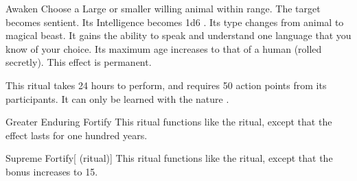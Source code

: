 \lowercase{\hypertarget{spell:Awaken}{}}\label{spell:Awaken}
\begin{apability}[\nth{5}]{\hypertarget{spell:Awaken}{Awaken}}
Choose a Large or smaller willing animal within \rngclose range.
The target becomes sentient.
Its Intelligence becomes 1d6 .
Its type changes from animal to magical beast.
It gains the ability to speak and understand one language that you know of your choice.
Its maximum age increases to that of a human (rolled secretly).
This effect is permanent.

This ritual takes 24 hours to perform, and requires 50 action points from its participants.
It can only be learned with the nature .
\end{apability}
\vspace{0.25em}



\lowercase{\hypertarget{spell:Greater Enduring Fortify}{}}\label{spell:Greater Enduring Fortify}
\begin{apability}[\nth{5}]{\hypertarget{spell:Greater Enduring Fortify}{Greater Enduring Fortify}}
This ritual functions like the  ritual, except that the effect lasts for one hundred years.
\end{apability}
\vspace{0.25em}



\lowercase{\hypertarget{spell:Supreme Fortify}{}}\label{spell:Supreme Fortify}
\begin{attuneability}[\nth{6}]{\hypertarget{spell:Supreme Fortify}{Supreme Fortify}}[ (ritual)]
This ritual functions like the  ritual, except that the  bonus increases to 15.
\end{attuneability}
\vspace{0.25em}


